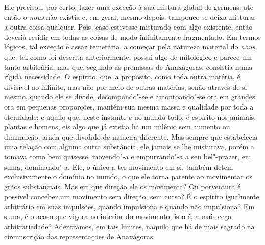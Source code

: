 Ele precisou, por certo, fazer uma exceção à sua mistura global de
germens: até então o \textit{nous} não existia e, em geral, mesmo
depois, tampouco se deixa misturar a outra coisa qualquer. Pois, caso
estivesse misturado com algo existente, então deveria residir em todas
as coisas de modo infinitamente fragmentado. Em termos lógicos, tal
exceção é assaz temerária, a começar pela natureza material do
\textit{nous}, que, tal como foi descrita anteriormente, possui algo de
mitológico e parece um tanto arbitrária, mas que, segundo as premissas
de Anaxágoras, consistia numa rígida necessidade. O espírito, que, a
propósito, como toda outra matéria, é divisível ao infinito, mas não
por meio de outras matérias, senão através de si mesmo, quando ele
se divide, decompondo"-se e amontoando"-se ora em grandes ora em pequenas
proporções, mantém sua mesma massa e qualidade por toda a eternidade;
e aquilo que, neste instante e no mundo todo, é espírito nos animais,
plantas e homens, eis algo que já existia há um milênio sem aumento ou
diminuição, ainda que dividido de maneira diferente. Mas sempre que
estabelecia uma relação com alguma outra substância, ele jamais se lhe
misturava, porém a tomava como bem quisesse, movendo"-a e
empurrando"-a a seu bel"-prazer, em suma, dominando"-a. Ele, o único a ter
movimento em si, também detém exclusivamente o domínio no mundo, o que
ele torna patente ao movimentar os grãos substanciais. Mas em que
direção ele os movimenta? Ou porventura é possível conceber um
movimento sem direção, sem curso? É o espírito igualmente arbitrário em
suas impulsões, quando impulsiona e quando não impulsiona? Em suma, é o
acaso que vigora no interior do movimento, isto é, a mais cega
arbitrariedade? Adentramos, em tais limites, naquilo que há de mais
sagrado na circunscrição das representações de Anaxágoras. 

\sectionitem

